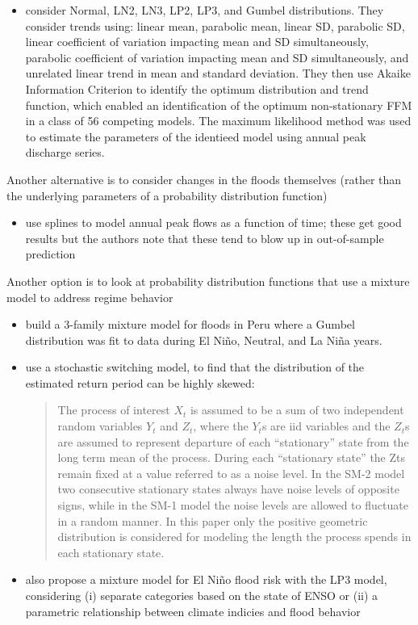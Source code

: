 \documentclass[11pt]{article}
\begin{document}
\begin{itemize}
\begin{itemize}
  \end{itemize}
  \item \citet{Strupczewski2001} consider Normal, LN2, LN3, LP2, LP3, and Gumbel distributions. They consider trends using: linear mean, parabolic mean, linear SD, parabolic SD, linear coefficient of variation impacting mean and SD simultaneously, parabolic coefficient of variation impacting mean and SD simultaneously, and unrelated linear trend in mean and standard deviation. They then use  Akaike Information Criterion  to identify the optimum distribution and trend function, which enabled an identification of the optimum non-stationary FFM in a class of 56 competing models. The maximum  likelihood  method was used to estimate the parameters of the identieed model using annual peak discharge series.
\end{itemize}

Another alternative is to consider changes in the floods themselves (rather than the underlying parameters of a probability distribution function)
\begin{itemize}
  \item \citet{Villarini2009} use splines to model annual peak flows as a function of time; these get good results but the authors note that these tend to blow up in out-of-sample prediction
\end{itemize}
Another option is to look at probability distribution functions that use a mixture model to address regime behavior
\begin{itemize}
  \item \citet{Waylen1986} build a 3-family mixture model for floods in Peru where a Gumbel distribution was fit to data during El Ni\~no, Neutral, and La Ni\~na years.
  \item \citet{Sveinsson2005} use a stochastic switching model, to find that the distribution of the estimated return period can be highly skewed:
  \begin{quotation}
    The process of interest  $X_t$  is assumed to be a sum of two independent random variables $Y_t$ and $Z_t$, where the $Y_t$s are {iid} variables and the $Z_t$s are assumed to represent departure of each “stationary” state from the long term mean of the process. During each “stationary state” the Zts remain fixed at a value referred to as a noise level. In the SM-2 model two consecutive stationary states always have noise levels of opposite signs, while in the SM-1 model the noise levels are allowed to fluctuate in a random manner. In this paper only the positive geometric distribution is considered for modeling the length the process spends in each stationary state.
  \end{quotation}
  \item \citet{Griffis2007} also propose a mixture model for El Ni\~no flood risk with the LP3 model, considering (i) separate categories based on the state of ENSO or (ii) a parametric relationship between climate indicies and flood behavior
\end{itemize}
\end{document}
